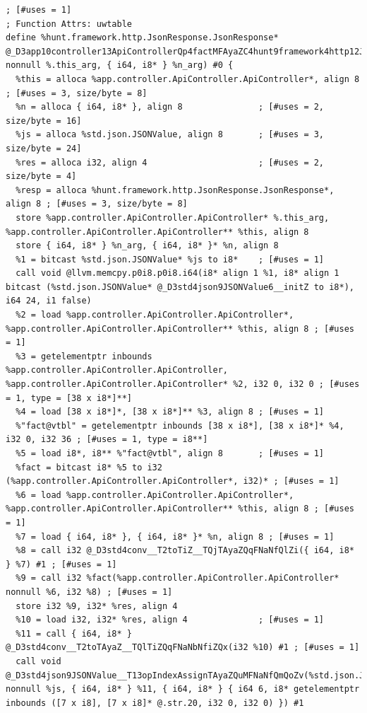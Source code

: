 \documentclass{studrep}
\begin{document}
\begin{verbatim}
; [#uses = 1]
; Function Attrs: uwtable
define %hunt.framework.http.JsonResponse.JsonResponse* @_D3app10controller13ApiControllerQp4factMFAyaZC4hunt9framework4http12JsonResponseQo(%app.controller.ApiController.ApiController* nonnull %.this_arg, { i64, i8* } %n_arg) #0 {
  %this = alloca %app.controller.ApiController.ApiController*, align 8 ; [#uses = 3, size/byte = 8]
  %n = alloca { i64, i8* }, align 8               ; [#uses = 2, size/byte = 16]
  %js = alloca %std.json.JSONValue, align 8       ; [#uses = 3, size/byte = 24]
  %res = alloca i32, align 4                      ; [#uses = 2, size/byte = 4]
  %resp = alloca %hunt.framework.http.JsonResponse.JsonResponse*, align 8 ; [#uses = 3, size/byte = 8]
  store %app.controller.ApiController.ApiController* %.this_arg, %app.controller.ApiController.ApiController** %this, align 8
  store { i64, i8* } %n_arg, { i64, i8* }* %n, align 8
  %1 = bitcast %std.json.JSONValue* %js to i8*    ; [#uses = 1]
  call void @llvm.memcpy.p0i8.p0i8.i64(i8* align 1 %1, i8* align 1 bitcast (%std.json.JSONValue* @_D3std4json9JSONValue6__initZ to i8*), i64 24, i1 false)
  %2 = load %app.controller.ApiController.ApiController*, %app.controller.ApiController.ApiController** %this, align 8 ; [#uses = 1]
  %3 = getelementptr inbounds %app.controller.ApiController.ApiController, %app.controller.ApiController.ApiController* %2, i32 0, i32 0 ; [#uses = 1, type = [38 x i8*]**]
  %4 = load [38 x i8*]*, [38 x i8*]** %3, align 8 ; [#uses = 1]
  %"fact@vtbl" = getelementptr inbounds [38 x i8*], [38 x i8*]* %4, i32 0, i32 36 ; [#uses = 1, type = i8**]
  %5 = load i8*, i8** %"fact@vtbl", align 8       ; [#uses = 1]
  %fact = bitcast i8* %5 to i32 (%app.controller.ApiController.ApiController*, i32)* ; [#uses = 1]
  %6 = load %app.controller.ApiController.ApiController*, %app.controller.ApiController.ApiController** %this, align 8 ; [#uses = 1]
  %7 = load { i64, i8* }, { i64, i8* }* %n, align 8 ; [#uses = 1]
  %8 = call i32 @_D3std4conv__T2toTiZ__TQjTAyaZQqFNaNfQlZi({ i64, i8* } %7) #1 ; [#uses = 1]
  %9 = call i32 %fact(%app.controller.ApiController.ApiController* nonnull %6, i32 %8) ; [#uses = 1]
  store i32 %9, i32* %res, align 4
  %10 = load i32, i32* %res, align 4              ; [#uses = 1]
  %11 = call { i64, i8* } @_D3std4conv__T2toTAyaZ__TQlTiZQqFNaNbNfiZQx(i32 %10) #1 ; [#uses = 1]
  call void @_D3std4json9JSONValue__T13opIndexAssignTAyaZQuMFNaNfQmQoZv(%std.json.JSONValue* nonnull %js, { i64, i8* } %11, { i64, i8* } { i64 6, i8* getelementptr inbounds ([7 x i8], [7 x i8]* @.str.20, i32 0, i32 0) }) #1

\end{verbatim}
\end{document}
